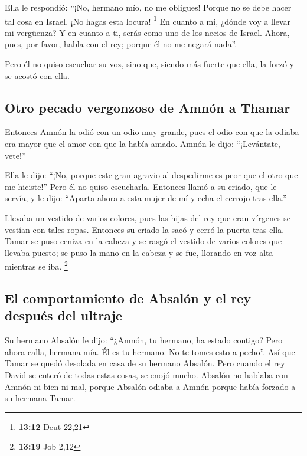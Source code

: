  Ella le respondió: ``¡No, hermano mío, no me obligues!
Porque no se debe hacer tal cosa en Israel. ¡No hagas esta locura!
\footnote{\textbf{13:12} Deut 22,21}  En cuanto a mí,
¿dónde voy a llevar mi vergüenza? Y en cuanto a ti, serás como uno de
los necios de Israel. Ahora, pues, por favor, habla con el rey; porque
él no me negará nada''.

 Pero él no quiso escuchar su voz, sino que, siendo más
fuerte que ella, la forzó y se acostó con ella.

\hypertarget{otro-pecado-vergonzoso-de-amnuxf3n-a-thamar}{%
\subsection{Otro pecado vergonzoso de Amnón a
Thamar}\label{otro-pecado-vergonzoso-de-amnuxf3n-a-thamar}}

 Entonces Amnón la odió con un odio muy grande, pues el
odio con que la odiaba era mayor que el amor con que la había amado.
Amnón le dijo: ``¡Levántate, vete!''

 Ella le dijo: ``¡No, porque este gran agravio al
despedirme es peor que el otro que me hiciste!'' Pero él no quiso
escucharla.  Entonces llamó a su criado, que le servía, y
le dijo: ``Aparta ahora a esta mujer de mí y echa el cerrojo tras
ella.''

 Llevaba un vestido de varios colores, pues las hijas del
rey que eran vírgenes se vestían con tales ropas. Entonces su criado la
sacó y cerró la puerta tras ella.  Tamar se puso ceniza
en la cabeza y se rasgó el vestido de varios colores que llevaba puesto;
se puso la mano en la cabeza y se fue, llorando en voz alta mientras se
iba. \footnote{\textbf{13:19} Job 2,12}

\hypertarget{el-comportamiento-de-absaluxf3n-y-el-rey-despuuxe9s-del-ultraje}{%
\subsection{El comportamiento de Absalón y el rey después del
ultraje}\label{el-comportamiento-de-absaluxf3n-y-el-rey-despuuxe9s-del-ultraje}}

 Su hermano Absalón le dijo: ``¿Amnón, tu hermano, ha
estado contigo? Pero ahora calla, hermana mía. Él es tu hermano. No te
tomes esto a pecho''. Así que Tamar se quedó desolada en casa de su
hermano Absalón.  Pero cuando el rey David se enteró de
todas estas cosas, se enojó mucho.  Absalón no hablaba
con Amnón ni bien ni mal, porque Absalón odiaba a Amnón porque había
forzado a su hermana Tamar.

